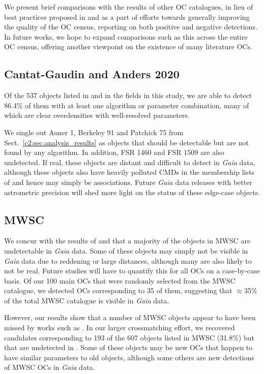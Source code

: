 We present brief comparisons with the results of other OC catalogues, in lieu of best practices proposed in \cite{cantat-gaudin_clusters_2020} and as a part of efforts towards generally improving the quality of the OC census, reporting on both positive and negative detections. In future works, we hope to expand comparisons such as this across the entire OC census, offering another viewpoint on the existence of many literature OCs.


\subsection{Cantat-Gaudin and Anders 2020}

Of the 537 objects listed in \cite{cantat-gaudin_clusters_2020} and in the fields in this study, we are able to detect 86.4\% of them with at least one algorithm or parameter combination, many of which are clear overdensities with well-resolved parameters.

We single out Auner 1, Berkeley 91 and Patchick 75 from Sect.~\ref{c2:sec:analysis_results} as objects that should be detectable but are not found by any algorithm. In addition, FSR 1460 and FSR 1509 are also undetected. If real, these objects are distant and difficult to detect in \emph{Gaia} data, although these objects also have heavily polluted CMDs in the membership lists of \cite{cantat-gaudin_clusters_2020} and hence may simply be associations. Future \emph{Gaia} data releases with better astrometric precision will shed more light on the status of these edge-case objects.


\subsection{MWSC}

We concur with the results of \cite{cantat-gaudin_gaia_2018} and \cite{cantat-gaudin_clusters_2020} that a majority of the objects in MWSC are undetectable in \emph{Gaia} data. Some of these objects may simply not be visible in \emph{Gaia} data due to reddening or large distances, although many are also likely to not be real. Future studies will have to quantify this for all OCs on a case-by-case basis. Of our 100 main OCs that were randomly selected from the MWSC catalogue, we detected OCs corresponding to 35 of them, suggesting that $\approx$35\% of the total MWSC catalogue is visible in \emph{Gaia} data. 

However, our results show that a number of MWSC objects appear to have been missed by works such as \cite{cantat-gaudin_clusters_2020}. In our larger crossmatching effort, we recovered candidates corresponding to 193 of the 607 objects listed in MWSC (31.8\%) but that are undetected in \cite{cantat-gaudin_clusters_2020}. Some of these objects may be new OCs that happen to have similar parameters to old objects, although some others are new detections of MWSC OCs in \emph{Gaia} data.

